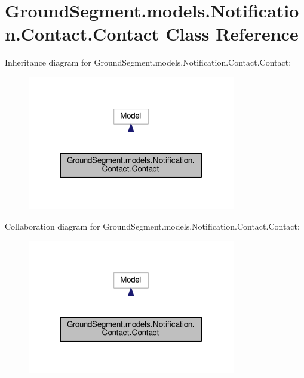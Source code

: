 \hypertarget{class_ground_segment_1_1models_1_1_notification_1_1_contact_1_1_contact}{}\section{Ground\+Segment.\+models.\+Notification.\+Contact.\+Contact Class Reference}
\label{class_ground_segment_1_1models_1_1_notification_1_1_contact_1_1_contact}


Inheritance diagram for Ground\+Segment.\+models.\+Notification.\+Contact.\+Contact\+:\nopagebreak
\begin{figure}[H]
\begin{center}
\leavevmode
\includegraphics[width=257pt]{class_ground_segment_1_1models_1_1_notification_1_1_contact_1_1_contact__inherit__graph}
\end{center}
\end{figure}


Collaboration diagram for Ground\+Segment.\+models.\+Notification.\+Contact.\+Contact\+:\nopagebreak
\begin{figure}[H]
\begin{center}
\leavevmode
\includegraphics[width=257pt]{class_ground_segment_1_1models_1_1_notification_1_1_contact_1_1_contact__coll__graph}
\end{center}
\end{figure}
